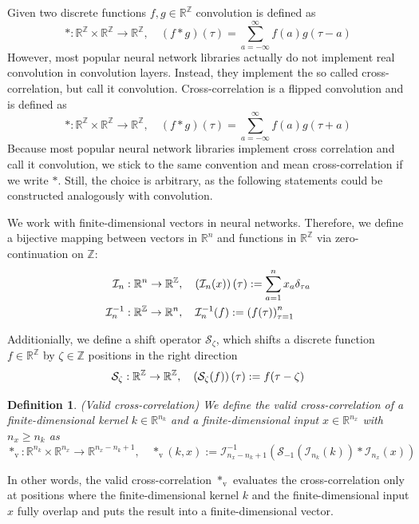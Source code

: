 \documentclass[twoside,a4paper]{article}
\newtheorem{definition}{Definition}
\begin{document}
Given two discrete functions $f,g \in \mathbb{R}^\mathbb{Z}$ convolution is defined as 
\begin{equation*}
	*: \mathbb{R}^{\mathbb{Z}} \times \mathbb{R}^{\mathbb{Z}} \to \mathbb{R}^{\mathbb{Z}},
	\quad (f*g)(\tau) = \sum^{\infty}_{a=-\infty} f(a) g(\tau - a)
\end{equation*}
However, most popular neural network libraries actually do not implement real convolution
in convolution layers. Instead, they implement the so called cross-correlation, but call it convolution. 
Cross-correlation is a flipped convolution and is defined as
\begin{equation*}
	*: \mathbb{R}^{\mathbb{Z}} \times \mathbb{R}^{\mathbb{Z}} \to \mathbb{R}^{\mathbb{Z}},
	\quad (f*g)(\tau) = \sum^{\infty}_{a=-\infty} f(a) g(\tau + a)
\end{equation*}
Because most popular neural network libraries implement cross correlation and call it convolution,
we stick to the same convention and mean cross-correlation if we write $*$.
Still, the choice is arbitrary, as the following statements could be constructed analogously with convolution.

We work with finite-dimensional vectors in neural networks. Therefore, we define a bijective mapping between
vectors in $\mathbb{R}^n$ and functions in $\mathbb{R}^{\mathbb{Z}}$ 
via zero-continuation on $\mathbb{Z}$:
\begin{align*}
	\mathcal{I}_n &: \mathbb{R}^n \to \mathbb{R}^{\mathbb{Z}},
	\quad \left(\mathcal{I}_n(x)\right)(\tau) := \sum_{a=1}^{n} x_a \delta_{\tau a} \\
	\mathcal{I}_n^{-1} &: \mathbb{R}^{\mathbb{Z}} \to \mathbb{R}^n,
	\quad \mathcal{I}_n^{-1}(f) := \left( f(\tau) \right)_{\tau=1}^n
\end{align*}

Additionially, we define a shift operator $\mathcal{S}_\zeta$, 
which shifts a discrete function $f \in \mathbb{R}^\mathbb{Z}$ by $\zeta \in \mathbb{Z}$ positions
in the right direction
\begin{equation*}
	\mathcal{S}_\zeta : \mathbb{R}^{\mathbb{Z}} \to \mathbb{R}^{\mathbb{Z}},
	\quad \left( \mathcal{S}_\zeta(f) \right) (\tau) := f(\tau - \zeta)
\end{equation*}

\begin{definition}\label{def_cross_corr}
	(Valid cross-correlation)
	We define the valid cross-correlation of a finite-dimensional kernel $k \in \mathbb{R}^{n_k}$ and 
	a finite-dimensional input $x \in \mathbb{R}^{n_x}$ with $n_x \geq n_k$ as
	\begin{equation*}
		*_{\text{v}} : \mathbb{R}^{n_k} \times \mathbb{R}^{n_x} \to \mathbb{R}^{n_x-n_k+1},
		\quad *_{\text{v}}(k,x) := \mathcal{I}_{n_x-n_k+1}^{-1} (
			\mathcal{S}_{-1}( \mathcal{I}_{n_k}(k)) * \mathcal{I}_{n_x}(x)
		)
	\end{equation*}
\end{definition}
In other words, the valid cross-correlation $*_{\text{v}}$ evaluates the cross-correlation 
only at positions where the finite-dimensional kernel $k$ and the 
finite-dimensional input $x$ fully overlap and puts the result into a finite-dimensional vector.
\end{document}
